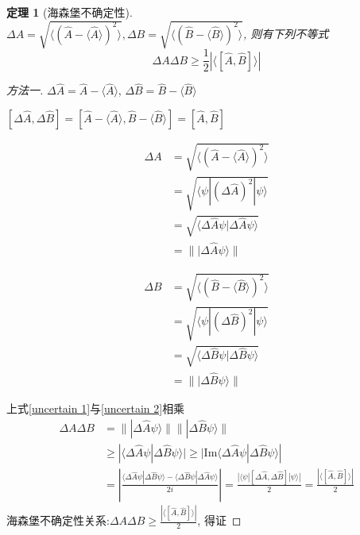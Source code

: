 \documentclass[a4paper,11pt]{book}
\newtheorem{theorem}{\hspace{2em}定理}[section]
\newtheorem{proof}{证明}[section]
\begin{document}
\begin{theorem}[海森堡不确定性]\label{uncertain relation}\quad\\
  $\Delta A=\sqrt{\langle(\hat{A}-\langle\hat{A}\rangle)^2\rangle},\Delta B=\sqrt{\langle(\hat{B}-\langle\hat{B}\rangle)^2\rangle}$, 则有下列不等式
  \begin{equation*}
    \Delta A\Delta B\geq\frac{1}{2}|\langle[\hat{A},\hat{B}]\rangle|
  \end{equation*}
\end{theorem}
\begin{proof}[方法一]
  $\Delta\hat{A}=\hat{A}-\langle\hat{A}\rangle$, $\Delta\hat{B}=\hat{B}-\langle\hat{B}\rangle$

  $[\Delta\hat{A},\Delta\hat{B}]=[\hat{A}-\langle\hat{A}\rangle,\hat{B}-\langle\hat{B}\rangle]=[\hat{A},\hat{B}]$

  \begin{minipage}[H]{0.5\linewidth}
  \begin{equation}\label{uncertain 1}
    \begin{split}
       \Delta A& =\sqrt{\langle(\hat{A}-\langle\hat{A}\rangle)^2\rangle} \\
         & =\sqrt{\langle\psi|(\Delta\hat{A})^2|\psi\rangle} \\
         & =\sqrt{\langle\Delta\hat{A}\psi|\Delta\hat{A}\psi\rangle} \\
         & =\||\Delta\hat{A}\psi\rangle\|
    \end{split}
  \end{equation}
  \end{minipage}
  \begin{minipage}[H]{0.5\linewidth}
  \begin{equation}\label{uncertain 2}
    \begin{split}
       \Delta B& =\sqrt{\langle(\hat{B}-\langle\hat{B}\rangle)^2\rangle} \\
         & =\sqrt{\langle\psi|(\Delta\hat{B})^2|\psi\rangle} \\
         & =\sqrt{\langle\Delta\hat{B}\psi|\Delta\hat{B}\psi\rangle} \\
         & =\||\Delta\hat{B}\psi\rangle\|
    \end{split}
  \end{equation}
  \end{minipage}
  上式\eqref{uncertain 1}与\eqref{uncertain 2}相乘
  \begin{equation*}
    \begin{split}
       \Delta A\Delta B&=\||\Delta\hat{A}\psi\rangle\|\||\Delta\hat{B}\psi\rangle\|\\
         &\geq|\langle\Delta\hat{A}\psi|\Delta\hat{B}\psi\rangle|\geq|\mathrm{Im}\langle\Delta\hat{A}\psi|\Delta\hat{B}\psi\rangle|\\
         &=|\frac{\langle\Delta\hat{A}\psi|\Delta\hat{B}\psi\rangle-\langle\Delta\hat{B}\psi|\Delta\hat{A}\psi\rangle}{2i}|=\frac{|\langle\psi|[\Delta\hat{A},\Delta\hat{B}]|\psi\rangle|}{2}=\frac{|\langle[\hat{A},\hat{B}]\rangle|}{2}
    \end{split}
  \end{equation*}
  海森堡不确定性关系:$\Delta A\Delta B\geq\frac{|\langle[\hat{A},\hat{B}]\rangle|}{2}$, 得证
\end{proof}
\end{document}

